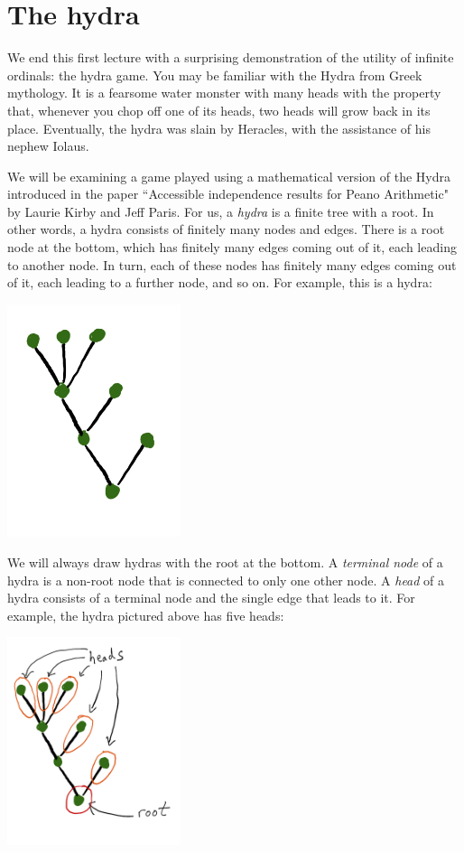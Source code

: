 \documentclass[a4paper]{memoir}
\theoremstyle{definition}
\begin{document}
\section{The hydra}

We end this first lecture with a surprising demonstration of the utility of infinite ordinals: 
the hydra game. You may be familiar with the Hydra from Greek mythology. It is a fearsome water 
monster with many heads with the property that, whenever you chop off one of its heads, two 
heads will grow back in its place. Eventually, the hydra was slain by Heracles, with the 
assistance of his nephew Iolaus.

We will be examining a game played using a mathematical version of the Hydra introduced in the paper 
``Accessible independence results for Peano Arithmetic" by Laurie Kirby and Jeff Paris. For us, a \emph{hydra} 
is a finite tree with a root. In other words, a hydra consists of finitely many nodes and edges. 
There is a root node at the bottom, which has finitely many edges coming out of it, each leading 
to another node. In turn, each of these nodes has finitely many edges coming out of it, each 
leading to a further node, and so on. For example, this is a hydra:
\begin{center}
  \includegraphics[width=2in]{Hydra1}
\end{center}

We will always draw hydras with the root at the bottom. A \emph{terminal node} of a hydra is a 
non-root node that is connected to only one other node. A \emph{head} of a hydra consists of a 
terminal node and the single edge that leads to it. For example, the hydra pictured above has 
five heads:
\begin{center}
  \includegraphics[width=2in]{Hydra2}
\end{center}
\end{document}
